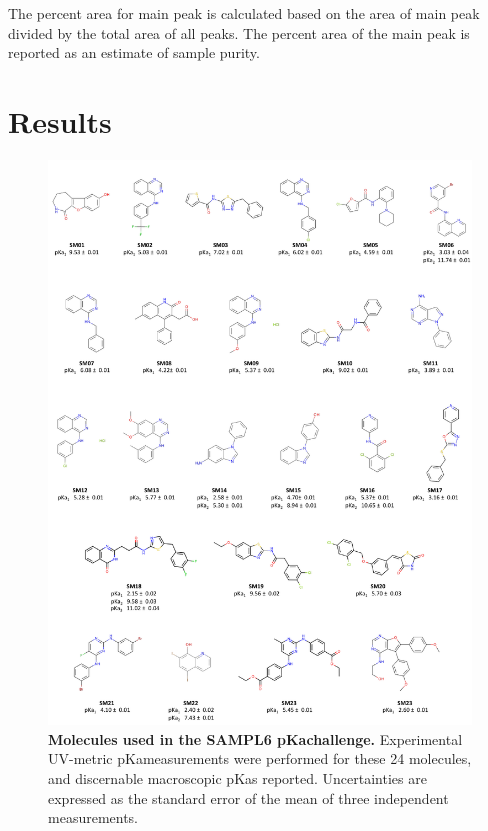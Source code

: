 \documentclass[9pt,lineno]{elife}
\newcommand{\pKa}{pKa}
\begin{document}
The percent area for main peak is calculated based on the area of main peak divided by the total area of all peaks. The percent area of the main peak is reported as an estimate of sample purity.


\section{Results}

\begin{figure}
\includegraphics[width=0.95\linewidth]{figures/SAMPL6_pKa_molecules_fig}
\caption{{\bf Molecules used in the SAMPL6 \pKa  challenge.} 
Experimental UV-metric \pKa measurements were performed for these 24 molecules, and discernable macroscopic {\pKa}s reported. 
Uncertainties are expressed as the standard error of the mean of three independent measurements.
}
\label{fig:pKa_molecules}
\end{figure}
\end{document}
